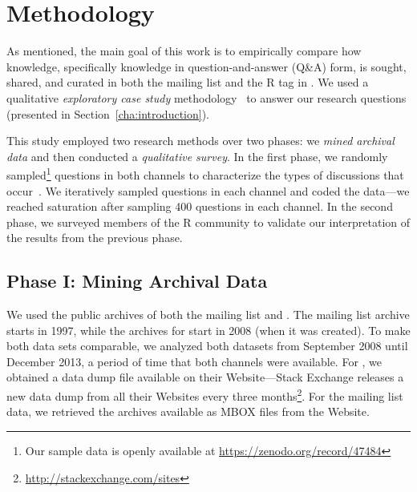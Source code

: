 \section{Methodology}
\label{cha:methodology}

As mentioned, the main goal of this work is to empirically compare how knowledge, specifically knowledge in question-and-answer (Q\&A) form, is sought, shared, and curated in both the \RH mailing list and the R tag in \SO. We used a qualitative \textit{exploratory case study} methodology~\cite{Creswell2009,Runeson2012} to answer our research questions (presented in Section~\ref{cha:introduction}).


This study employed two research methods over two phases: we \textit{mined archival data} and then conducted a \textit{qualitative survey}. In the first phase,
we randomly sampled\footnote{Our sample data is openly available at \url{https://zenodo.org/record/47484}} questions in both channels to characterize the types of discussions that occur~\cite{carlos_gomez_teshima_2016_47484}. We iteratively sampled questions in each channel and coded
the data---we reached saturation after sampling 400 questions in each channel. In the second phase, we surveyed members of the R community to validate our interpretation of the results from the previous phase. %

\subsection{Phase I: Mining Archival Data} 
\label{sec:studyDesign}
We used the public archives of both	the \RH mailing list and \SO. The \RH mailing list archive starts in 1997, while the archives for \SO start in 2008 (when it was created).
To make both data sets comparable, we analyzed both datasets from September 2008 until December 2013, a period of time that both channels were available.
For \SO, we obtained a data dump file available on their Website---Stack Exchange releases a new data dump from all their Websites every three months\footnote{\url{http://stackexchange.com/sites}}. For the \RH mailing list data, we retrieved the archives available as MBOX files from the \RH Website.

